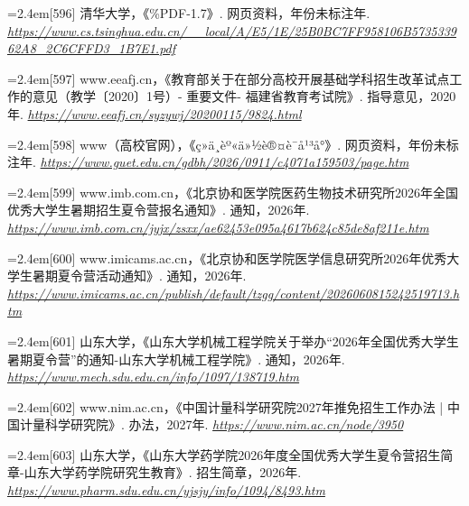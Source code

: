 {\par\noindent\hangindent=2.4em\label{src:S0359}{\color{cAccent}[596]} 清华大学，《\%PDF-1.7》. 网页资料，年份未标注年. \textit{\url{https://www.cs.tsinghua.edu.cn/__local/A/E5/1E/25B0BC7FF958106B573533962A8_2C6CFFD3_1B7E1.pdf}}\par
\par\noindent\hangindent=2.4em\label{src:S0361}{\color{cAccent}[597]} www.eeafj.cn，《教育部关于在部分高校开展基础学科招生改革试点工作的意见（教学〔2020〕1号）-
重要文件-
福建省教育考试院》. 指导意见，2020年. \textit{\url{https://www.eeafj.cn/syzywj/20200115/9824.html}}\par
\par\noindent\hangindent=2.4em\label{src:S0371}{\color{cAccent}[598]} www（高校官网），《ç»ä¸èº«ä»½è®¤è¯å¹³å°》. 网页资料，年份未标注年. \textit{\url{https://www.guet.edu.cn/gdbh/2026/0911/c4071a159503/page.htm}}\par
\par\noindent\hangindent=2.4em\label{src:S0372}{\color{cAccent}[599]} www.imb.com.cn，《北京协和医学院医药生物技术研究所2026年全国优秀大学生暑期招生夏令营报名通知》. 通知，2026年. \textit{\url{https://www.imb.com.cn/jyjx/zsxx/ae62453e095a4617b624c85de8af211e.htm}}\par
\par\noindent\hangindent=2.4em\label{src:S0374}{\color{cAccent}[600]} www.imicams.ac.cn，《北京协和医学院医学信息研究所2026年优秀大学生暑期夏令营活动通知》. 通知，2026年. \textit{\url{https://www.imicams.ac.cn/publish/default/tzgg/content/2026060815242519713.htm}}\par
\par\noindent\hangindent=2.4em\label{src:S0379}{\color{cAccent}[601]} 山东大学，《山东大学机械工程学院关于举办“2026年全国优秀大学生暑期夏令营”的通知-山东大学机械工程学院》. 通知，2026年. \textit{\url{https://www.mech.sdu.edu.cn/info/1097/138719.htm}}\par
\par\noindent\hangindent=2.4em\label{src:S0381}{\color{cAccent}[602]} www.nim.ac.cn，《中国计量科学研究院2027年推免招生工作办法 | 中国计量科学研究院》. 办法，2027年. \textit{\url{https://www.nim.ac.cn/node/3950}}\par
\par\noindent\hangindent=2.4em\label{src:S0383}{\color{cAccent}[603]} 山东大学，《山东大学药学院2026年度全国优秀大学生夏令营招生简章-山东大学药学院研究生教育》. 招生简章，2026年. \textit{\url{https://www.pharm.sdu.edu.cn/yjsjy/info/1094/8493.htm}}\par
}

